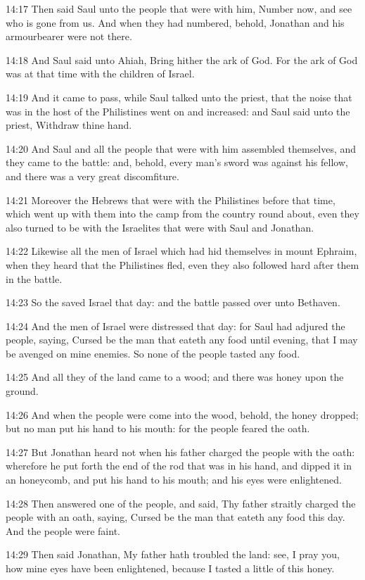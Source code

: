 14:17 Then said Saul unto the people that were with him, Number now, and see who is gone from us. And when they had numbered, behold, Jonathan and his armourbearer were not there.

14:18 And Saul said unto Ahiah, Bring hither the ark of God. For the ark of God was at that time with the children of Israel.

14:19 And it came to pass, while Saul talked unto the priest, that the noise that was in the host of the Philistines went on and increased: and Saul said unto the priest, Withdraw thine hand.

14:20 And Saul and all the people that were with him assembled themselves, and they came to the battle: and, behold, every man's sword was against his fellow, and there was a very great discomfiture.

14:21 Moreover the Hebrews that were with the Philistines before that time, which went up with them into the camp from the country round about, even they also turned to be with the Israelites that were with Saul and Jonathan.

14:22 Likewise all the men of Israel which had hid themselves in mount Ephraim, when they heard that the Philistines fled, even they also followed hard after them in the battle.

14:23 So the \LORD saved Israel that day: and the battle passed over unto Bethaven.

14:24 And the men of Israel were distressed that day: for Saul had adjured the people, saying, Cursed be the man that eateth any food until evening, that I may be avenged on mine enemies. So none of the people tasted any food.

14:25 And all they of the land came to a wood; and there was honey upon the ground.

14:26 And when the people were come into the wood, behold, the honey dropped; but no man put his hand to his mouth: for the people feared the oath.

14:27 But Jonathan heard not when his father charged the people with the oath: wherefore he put forth the end of the rod that was in his hand, and dipped it in an honeycomb, and put his hand to his mouth; and his eyes were enlightened.

14:28 Then answered one of the people, and said, Thy father straitly charged the people with an oath, saying, Cursed be the man that eateth any food this day. And the people were faint.

14:29 Then said Jonathan, My father hath troubled the land: see, I pray you, how mine eyes have been enlightened, because I tasted a little of this honey.

